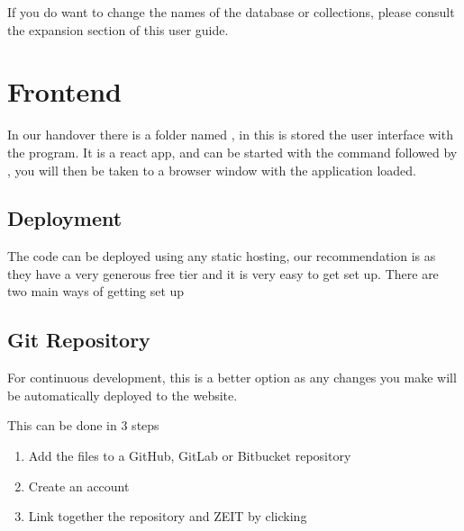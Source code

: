 \documentclass[letterpaper,10pt,english]{sphinxmanual}
\let\oldsubsection\subsection
\renewcommand{\subsection}{\needspace{6\baselineskip}\oldsubsection}
\begin{document}
If you do want to change the names of the database or collections,
please consult the expansion section of this user guide.


\section{Frontend}
\label{\detokenize{docs/Installation/frontEnd:frontend}}\label{\detokenize{docs/Installation/frontEnd::doc}}
In our handover there is a folder named , in this is stored
the user interface with the program. It is a react app, and can be
started with the command  followed by , you
will then be taken to a browser window with the application loaded.


\subsection{Deployment}
\label{\detokenize{docs/Installation/frontEnd:deployment}}
The code can be deployed using any static hosting, our
recommendation is  as they have a very
generous free tier and it is very easy to get set up. There are two main
ways of getting set up


\subsection{Git Repository}
\label{\detokenize{docs/Installation/frontEnd:git-repository}}

For continuous development, this is a better option as any changes you
make will be automatically deployed to the website.

This can be done in 3 steps
\begin{enumerate}
%
\item {} 
Add the files to a GitHub, GitLab or Bitbucket repository

\item {} 
Create an account 

\item {} 
Link together the repository and ZEIT by clicking 

\end{enumerate}
\end{document}
